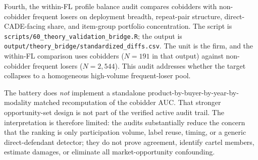 Fourth, the within-FL profile balance audit compares cobidders
with non-cobidder frequent losers on deployment breadth,
repeat-pair structure, direct-CADE-facing share, and item-group
portfolio concentration. The script is
\texttt{scripts/60\_theory\_validation\_bridge.R}; the output is
\texttt{output/theory\_bridge/standardized\_diffs.csv}. The unit
is the firm, and the within-FL comparison uses cobidders
($N=191$ in that output) against non-cobidder frequent losers
($N=2{,}544$). This audit addresses whether the target collapses
to a homogeneous high-volume frequent-loser pool.

The battery does \emph{not} implement a standalone
product-by-buyer-by-year-by-modality matched recomputation of the
cobidder AUC. That stronger opportunity-set design is not part of
the verified active audit trail. The interpretation is therefore
limited: the audits substantially reduce the concern that the
ranking is only participation volume, label reuse, timing, or a
generic direct-defendant detector; they do not prove agreement,
identify cartel members, estimate damages, or eliminate all
market-opportunity confounding.

